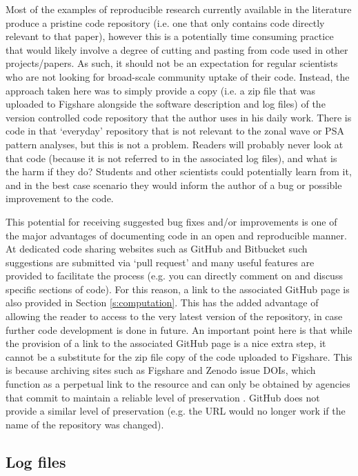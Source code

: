 Most of the examples of reproducible research currently available in the literature produce a pristine code repository (i.e. one that only contains code directly relevant to that paper), however this is a potentially time consuming practice that would likely involve a degree of cutting and pasting from code used in other projects/papers. As such, it should not be an expectation for regular scientists who are not looking for broad-scale community uptake of their code. Instead, the approach taken here was to simply provide a copy (i.e. a zip file that was uploaded to Figshare alongside the software description and log files) of the version controlled code repository that the author uses in his daily work. There is code in that `everyday' repository that is not relevant to the zonal wave or PSA pattern analyses, but this is not a problem. Readers will probably never look at that code (because it is not referred to in the associated log files), and what is the harm if they do? Students and other scientists could potentially learn from it, and in the best case scenario they would inform the author of a bug or possible improvement to the code.        

This potential for receiving suggested bug fixes and/or improvements is one of the major advantages of documenting code in an open and reproducible manner. At dedicated code sharing websites such as GitHub and Bitbucket such suggestions are submitted via `pull request' and many useful features are provided to facilitate the process (e.g. you can directly comment on and discuss specific sections of code). For this reason, a link to the associated GitHub page is also provided in Section \ref{s:computation}. This has the added advantage of allowing the reader to access to the very latest version of the repository, in case further code development is done in future. An important point here is that while the provision of a link to the associated GitHub page is a nice extra step, it cannot be a substitute for the zip file copy of the code uploaded to Figshare. This is because archiving sites such as Figshare and Zenodo issue DOIs, which function as a perpetual link to the resource and can only be obtained by agencies that commit to maintain a reliable level of preservation \citep{Potter2015}. GitHub does not provide a similar level of preservation (e.g. the URL would no longer work if the name of the repository was changed).

\subsection{Log files}\label{s:log_files}

